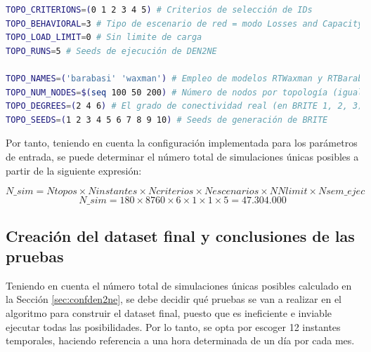 \vspace{3mm}

\begin{lstlisting}[language=bash, style=Consola, caption={Configuración de los parámetros de entrada en el script de automatización de \acrshort{den2ne}}]
TOPO_CRITERIONS=(0 1 2 3 4 5) # Criterios de selección de IDs
TOPO_BEHAVIORAL=3 # Tipo de escenario de red = modo Losses and Capacity (3)         
TOPO_LOAD_LIMIT=0 # Sin limite de carga
TOPO_RUNS=5 # Seeds de ejecución de DEN2NE

TOPO_NAMES=('barabasi' 'waxman') # Empleo de modelos RTWaxman y RTBarabasi (igual que BRITE)
TOPO_NUM_NODES=$(seq 100 50 200) # Número de nodos por topología (igual que BRITE)
TOPO_DEGREES=(2 4 6) # El grado de conectividad real (en BRITE 1, 2, 3)
TOPO_SEEDS=(1 2 3 4 5 6 7 8 9 10) # Seeds de generación de BRITE
\end{lstlisting}

\vspace{3mm}

Por tanto, teniendo en cuenta la configuración implementada para los parámetros de entrada, se puede determinar el número total de simulaciones únicas posibles a partir de la siguiente expresión:

    \[\textit{N\_sim} = \textit{Ntopos} \times \textit{Ninstantes} \times \textit{Ncriterios} 
    \times \textit{Nescenarios} \times \textit{NNlimit} \times \textit{Nsem\_ejec}\]
    \[\textit{N\_sim} = 180 \times 8760 \times 6 \times 1 \times 1 \times 5 = 47.304.000\] 

\pagebreak 

\subsection{Creación del dataset final y conclusiones de las pruebas}
\label{sec:datasetfinal}

Teniendo en cuenta el número total de simulaciones únicas posibles calculado en la Sección \ref{sec:confden2ne}, se debe decidir qué pruebas se van a realizar en el algoritmo para construir el dataset final, puesto que es ineficiente e inviable ejecutar todas las posibilidades. Por lo tanto, se opta por escoger 12 instantes temporales, haciendo referencia a una hora determinada de un día por cada mes. 

\vspace{3mm}

